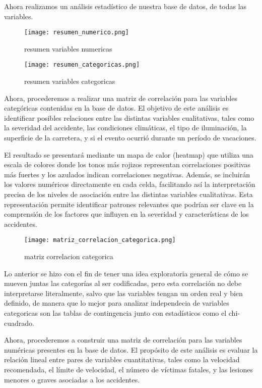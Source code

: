 \documentclass{book}
\begin{document}
Ahora realizamos un análisis estadístico de nuestra base de datos, de todas las variables.

\begin{figure}[h]
\centering
\texttt{[image: resumen\_numerico.png]}
\caption{\label{fig:resumen variables numericas}resumen variables numericas}
\end{figure}

\begin{figure}[htbp]
\centering
\texttt{[image: resumen\_categoricas.png]}
\caption{\label{fig:resumen variables categoricas}resumen variables categoricas}
\end{figure}

Ahora, procederemos a realizar una matriz de correlación para las variables categóricas contenidas en la base de datos. El objetivo de este análisis es identificar posibles relaciones entre las distintas variables cualitativas, tales como la severidad del accidente, las condiciones climáticas, el tipo de iluminación, la superficie de la carretera, y si el evento ocurrió durante un período de vacaciones.

El resultado se presentará mediante un mapa de calor (heatmap) que utiliza una escala de colores donde los tonos más rojizos representan correlaciones positivas más fuertes y los azulados indican correlaciones negativas. Además, se incluirán los valores numéricos directamente en cada celda, facilitando así la interpretación precisa de los niveles de asociación entre las distintas variables cualitativas. Esta representación permite identificar patrones relevantes que podrían ser clave en la comprensión de los factores que influyen en la severidad y características de los accidentes.

\begin{figure}[htbp]
\centering
\texttt{[image: matriz\_correlacion\_categorica.png]}
\caption{\label{fig:matriz correlacion categorica}matriz correlacion categorica}
\end{figure}

Lo anterior se hizo con el fin de tener una idea exploratoria general de cómo se mueven juntas las categorías al ser codificadas, pero esta correlación no debe interpretarse literalmente, salvo que las variables tengan un orden real y bien definido, de manera que lo mejor para analizar independecia de variables categoricas son las tablas de contingencia junto con estadísticos como el chi-cuadrado.

Ahora, procederemos a construir una matriz de correlación para las variables numéricas presentes en la base de datos. El propósito de este análisis es evaluar la relación lineal entre pares de variables cuantitativas, tales como la velocidad recomendada, el límite de velocidad, el número de víctimas fatales, y las lesiones menores o graves asociadas a los accidentes.
\end{document}
